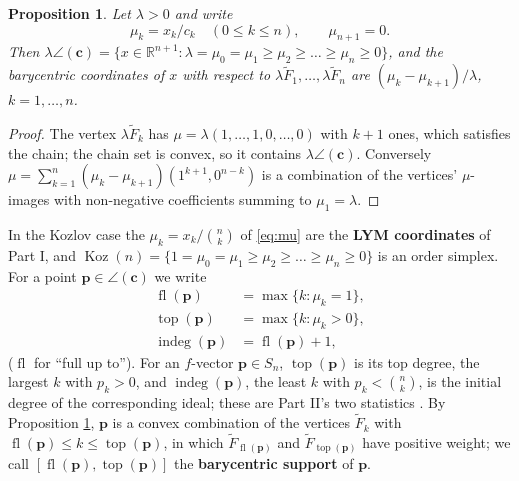 \documentclass[11pt, a4paper, abstract=yes]{scrartcl}
\theoremstyle{definition}
\theoremstyle{remark}
\theoremstyle{plain}
\newtheorem{proposition}[definition]{Proposition}
\newcommand{\vek}[1]{\boldsymbol{#1}}
\theoremstyle{remark}
\theoremstyle{plain}
\newcommand{\Koz}{\operatorname{Koz}}
\newcommand{\indeg}{\operatorname{indeg}}
\newcommand{\tp}{\operatorname{top}}
\newcommand{\rasimp}{\angle}
\newcommand{\fl}{\operatorname{fl}}
\newcommand{\leandiscof}[1]{\tikz[baseline=-0.6ex]\fill[#1] (0,0) circle (0.6ex);}
\newcommand{\leanfull}{\leandiscof{leanfull}}
\newcommand{\leanmark}[1]{\leavevmode{\reversemarginpar\marginnote{\raggedleft#1}}}
\let\autocite\cite
\begin{document}
\begin{proposition}
\leanmark{\leanfull}Let \(\lambda>0\) and write
\begin{equation}\label{eq:mu}
  \mu_k=x_k/c_k\quad(0\le k\le n),\qquad\mu_{n+1}=0 .
\end{equation}
Then
\(\lambda\rasimp(\vek c)=\lbrace x\in\mathbb R^{n+1}:\lambda=\mu_0=\mu_1\ge\mu_2\ge\dots\ge\mu_n\ge0\rbrace\),
and the barycentric coordinates of \(x\) with respect to \(\lambda\tilde F_1,\dots,\lambda\tilde F_n\)
are \((\mu_k-\mu_{k+1})/\lambda\), \(k=1,\dots,n\).
\label{prop-rank-one-H}
\end{proposition}

\begin{proof}
The vertex \(\lambda\tilde F_k\) has \(\mu=\lambda(1,\dots,1,0,\dots,0)\) with \(k+1\) ones, which
satisfies the chain; the chain set is convex, so it contains \(\lambda\rasimp(\vek c)\). Conversely
\(\mu=\sum_{k=1}^n(\mu_k-\mu_{k+1})(1^{k+1},0^{n-k})\) is a combination of the vertices'
\(\mu\)-images with non-negative coefficients summing to \(\mu_1=\lambda\).
\end{proof}

In the Kozlov case the \(\mu_k=x_k/\binom nk\) of \eqref{eq:mu} are the \textbf{LYM coordinates} of Part I, and
\(\Koz(n)=\lbrace1=\mu_0=\mu_1\ge\mu_2\ge\dots\ge\mu_n\ge0\rbrace\) is an order simplex. For a point
\(\vek p\in\rasimp(\vek c)\) we write
\begin{align}
  \fl(\vek p)&=\max\lbrace k:\mu_k=1\rbrace,\label{eq:fl}\\
  \tp(\vek p)&=\max\lbrace k:\mu_k>0\rbrace,\label{eq:tp}\\
  \indeg(\vek p)&=\fl(\vek p)+1,\label{eq:indeg}
\end{align}
(\(\fl\) for ``full up to''). For an \(f\)-vector \(\vek p\in S_n\), \(\tp(\vek p)\) is its top degree,
the largest \(k\) with \(p_k>0\), and \(\indeg(\vek p)\), the least \(k\) with \(p_k<\binom nk\), is
the initial degree of the corresponding ideal; these are Part II's two statistics
\autocite[Section 5]{SnellmanArticle2}. By Proposition \ref{prop-rank-one-H}, \(\vek p\) is a convex
combination of the vertices \(\tilde F_k\) with \(\fl(\vek p)\le k\le\tp(\vek p)\), in which
\(\tilde F_{\fl(\vek p)}\) and \(\tilde F_{\tp(\vek p)}\) have positive weight; we call
\([\fl(\vek p),\tp(\vek p)]\) the \textbf{barycentric support} of \(\vek p\).
\end{document}
